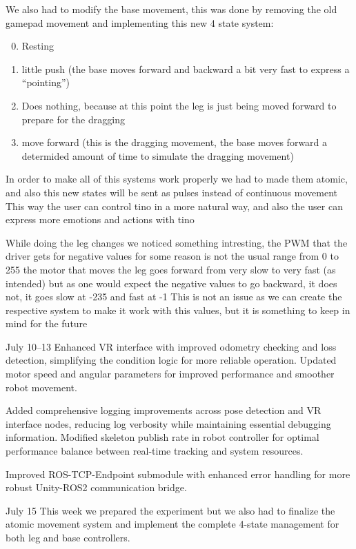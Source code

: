 We also had to modify the base movement, this was done by removing the old gamepad movement and implementing this new 4 state system:

\begin{enumerate}
\setcounter{enumi}{-1}
\item Resting
\item little push (the base moves forward and backward a bit very fast to express a ``pointing'')
\item Does nothing, because at this point the leg is just being moved forward to prepare for the dragging
\item move forward (this is the dragging movement, the base moves forward a determided amount of time to simulate the dragging movement)
\end{enumerate}

In order to make all of this systems work properly we had to made them atomic, and also this new states will be sent as pulses instead of continuous movement
This way the user can control tino in a more natural way, and also the user can express more emotions and actions with tino

While doing the leg changes we noticed something intresting, the PWM that the driver gets for negative values for some reason is not the usual range
from  0 to  255 the motor that moves the leg goes forward from very slow to very fast (as intended) but as one would expect the negative values to go backward, it does not, it goes slow at -235 and fast at -1 
This is not an issue as we can create the respective system to make it work with this values, but it is something to keep in mind for the future

July 10--13
Enhanced VR interface with improved odometry checking and loss detection, simplifying the condition logic for more reliable operation. Updated motor speed and angular parameters for improved performance and smoother robot movement.

Added comprehensive logging improvements across pose detection and VR interface nodes, reducing log verbosity while maintaining essential debugging information. Modified skeleton publish rate in robot controller for optimal performance balance between real-time tracking and system resources.

Improved ROS-TCP-Endpoint submodule with enhanced error handling for more robust Unity-ROS2 communication bridge.

July 15
This week we prepared the experiment but we also had to finalize the atomic movement system and implement the complete 4-state management for both leg and base controllers.

